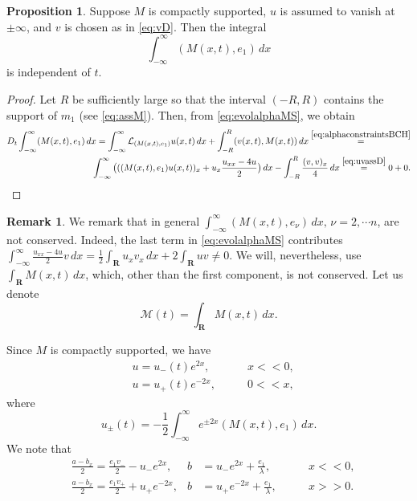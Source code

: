 \documentclass[10pt,a4paper]{article}
\numberwithin{equation}{section}
\theoremstyle{plain}
\theoremstyle{definition}
\newtheorem{remark}[remark]{Remark}
\newtheorem{proposition}[proposition]{Proposition}
\newcommand{\R}{\mathbf{R}}
\renewcommand{\l}{\lambda}
\begin{document}
\begin{proposition} \label{prop:m1CL}
Suppose $M$ is compactly supported, $u$ is assumed to vanish at $\pm \infty$, and $v$ is chosen as in \autoref{eq:vD}.   Then the integral 
\begin{equation} \label{eq:MassConservation}
\int_{-\infty} ^\infty (M(x,t), e_1)\, dx
\end{equation} 
is independent of $t$.  
\end{proposition}
\begin{proof} 
Let $R$ be sufficiently large so that the interval $(-R,R)$ contains the support of $m_1$ (see \eqref{eq:assM}). Then, from 	\eqref{eq:evolalphaMS}, we obtain 
\begin{align*} 
D_t \int_{-\infty} ^\infty (M(x,t),e_1)\, dx=\int_{-\infty} ^\infty \mathcal{L}_{(M(x,t),e_1)}u(x, t)\, dx+
\int_{-R} ^R (v(x,t), M(x,t))\, dx\stackrel{\eqref{eq:alphaconstraintsBCH}}{=}\\
\int_{-\infty}^\infty\big(((M(x,t), e_1)u(x,t))_x+u_x\frac{u_{xx}-4u}{2}\big)\, dx -\int_{-R}^R \frac{(v,v)_x}{4} \, dx\stackrel{\eqref{eq:uvassD}}{=}0+0.  
\end{align*}
\end{proof} 
\begin{remark} We remark that in general $\int_{-\infty}^\infty (M(x,t), e_\nu) \, dx,\,  \nu=2,\cdots n$,  are not conserved.  
Indeed, the last term in  \eqref{eq:evolalphaMS} contributes 
$\int_{-\infty}^\infty \frac{u_{xx}-4u}{2} v \, dx=\frac12 \int_{\R} u_xv_x \, dx +2 \int_{\R}uv\neq 0$.  
We will, nevertheless, use $\int_\R M(x,t)\, dx$, which, other than the first component, is not conserved.  
Let us denote 
\begin{equation} \label{eq:calM}
\mathcal{M}(t)=\int_\R M(x,t) \, dx .  
\end{equation} 
\end{remark} 
Since $M$ is compactly supported, we have 
\begin{align}  
&u=u_-(t)e^{2 x}, \qquad &x<<0, \label{eq:asminus}\\
&u=u_+(t) e^{-2 x}, \qquad &0<< x, \label{eq:asplus}
\end{align} 
where 
$$ 
u_\pm(t)=-\frac{1}{2} \int_{-\infty}^\infty e^{\pm 2x}(M(x,t),e_1) \, dx. 
$$
We note that 
\begin{align} 
&\frac{a-b_x}{2}=\frac{e_1v_-}{2} - u_- e^{2 x} , &b&=u_-e^{2x}  +\frac {e_1}{\l },\qquad  &x<< 0, \label{eq:abminus} \\
&\frac{a-b_x}{2} = \frac{e_1v_+}{2}+u_+e^{-2x},  &b&=u_+e^{-2x} +\frac{e_1}{\l}, \qquad & x>> 0. \label{eq:abplus} 
\end{align} 
\end{document}
